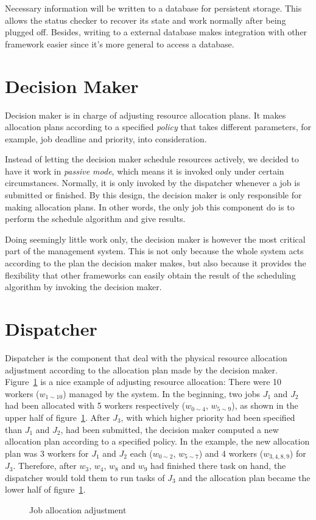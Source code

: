 Necessary information will be written to a database for persistent
storage.  This allows the status checker to recover its state and work
normally after being plugged off.  Besides, writing to a external
database makes integration with other framework easier since it's more
general to access a database.

\section{Decision Maker}

Decision maker is in charge of adjusting resource allocation plans.  It
makes allocation plans according to a specified \emph{policy} that takes
different parameters, for example, job deadline and priority, into
consideration. 

Instead of letting the decision maker schedule resources actively, we
decided to have it work in \emph{passive mode}, which means it is
invoked only under certain circumstances.  Normally, it is only invoked
by the dispatcher whenever a job is submitted or finished.  By this
design, the decision maker is only responsible for making allocation
plans.  In other words, the only job this component do is to perform the
schedule algorithm and give results.  

Doing seemingly little work only, the decision maker is however the most
critical part of the management system. This is not only because the
whole system acts according to the plan the decision maker makes, but
also because it provides the flexibility that other frameworks can
easily obtain the result of the scheduling algorithm by invoking the
decision maker.

\section{Dispatcher}

Dispatcher is the component that deal with the physical resource
allocation adjustment according to the allocation plan made by the
decision maker.  Figure~\ref{fig:allocation-adjustment} is a nice
example of adjusting resource allocation: There were 10 workers
($w_{1\sim10}$) managed by the system.  In the beginning, two jobs $J_1$
and $J_2$ had been allocated with 5 workers respectively ($w_{0\sim4}$,
$w_{5\sim9}$), as shown in the upper half of
figure~\ref{fig:allocation-adjustment}.  After $J_3$, with which higher
priority had been specified than $J_1$ and $J_2$, had been submitted,
the decision maker computed a new allocation plan according to a
specified policy.  In the example, the new allocation plan was 3 workers
for $J_1$ and $J_2$ each ($w_{0\sim2}$, $w_{5\sim7}$) and 4 workers
($w_{3,4,8,9}$) for $J_3$.  Therefore, after $w_3$, $w_4$, $w_8$ and $
w_9$ had finished there task on hand, the dispatcher would told them to
run tasks of $J_3$ and the allocation plan became the lower half of
figure~\ref{fig:allocation-adjustment}.

\begin{figure}
  \centering
  
  \caption{Job allocation adjustment}
  \label{fig:allocation-adjustment}
\end{figure}
